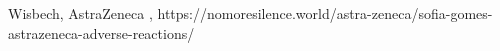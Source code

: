           {Wisbech, }
          {}
          {AstraZeneca}
          {}
          {
            ,
          }
          {https://nomoresilence.world/astra-zeneca/sofia-gomes-astrazeneca-adverse-reactions/}


